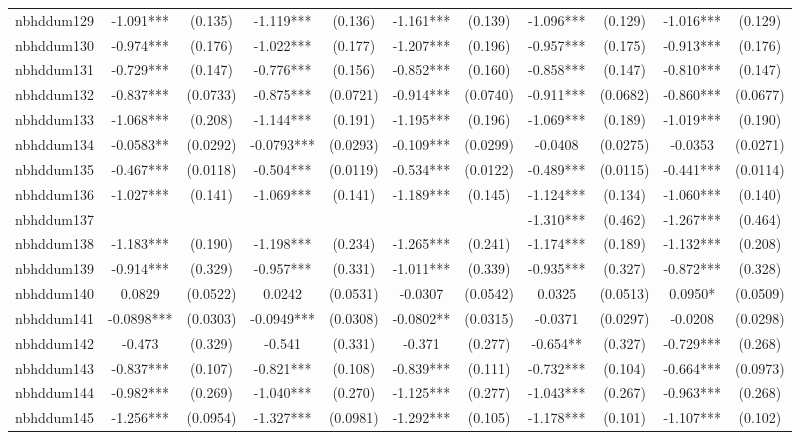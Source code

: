 \documentclass[]{article}
\begin{document}
\begin{tabular}{lcccccccccc}
nbhddum129 & -1.091*** & (0.135) & -1.119*** & (0.136) & -1.161*** & (0.139) & -1.096*** & (0.129) & -1.016*** & (0.129) \\
nbhddum130 & -0.974*** & (0.176) & -1.022*** & (0.177) & -1.207*** & (0.196) & -0.957*** & (0.175) & -0.913*** & (0.176) \\
nbhddum131 & -0.729*** & (0.147) & -0.776*** & (0.156) & -0.852*** & (0.160) & -0.858*** & (0.147) & -0.810*** & (0.147) \\
nbhddum132 & -0.837*** & (0.0733) & -0.875*** & (0.0721) & -0.914*** & (0.0740) & -0.911*** & (0.0682) & -0.860*** & (0.0677) \\
nbhddum133 & -1.068*** & (0.208) & -1.144*** & (0.191) & -1.195*** & (0.196) & -1.069*** & (0.189) & -1.019*** & (0.190) \\
nbhddum134 & -0.0583** & (0.0292) & -0.0793*** & (0.0293) & -0.109*** & (0.0299) & -0.0408 & (0.0275) & -0.0353 & (0.0271) \\
nbhddum135 & -0.467*** & (0.0118) & -0.504*** & (0.0119) & -0.534*** & (0.0122) & -0.489*** & (0.0115) & -0.441*** & (0.0114) \\
nbhddum136 & -1.027*** & (0.141) & -1.069*** & (0.141) & -1.189*** & (0.145) & -1.124*** & (0.134) & -1.060*** & (0.140) \\
nbhddum137 &  &  &  &  &  &  & -1.310*** & (0.462) & -1.267*** & (0.464) \\
nbhddum138 & -1.183*** & (0.190) & -1.198*** & (0.234) & -1.265*** & (0.241) & -1.174*** & (0.189) & -1.132*** & (0.208) \\
nbhddum139 & -0.914*** & (0.329) & -0.957*** & (0.331) & -1.011*** & (0.339) & -0.935*** & (0.327) & -0.872*** & (0.328) \\
nbhddum140 & 0.0829 & (0.0522) & 0.0242 & (0.0531) & -0.0307 & (0.0542) & 0.0325 & (0.0513) & 0.0950* & (0.0509) \\
nbhddum141 & -0.0898*** & (0.0303) & -0.0949*** & (0.0308) & -0.0802** & (0.0315) & -0.0371 & (0.0297) & -0.0208 & (0.0298) \\
nbhddum142 & -0.473 & (0.329) & -0.541 & (0.331) & -0.371 & (0.277) & -0.654** & (0.327) & -0.729*** & (0.268) \\
nbhddum143 & -0.837*** & (0.107) & -0.821*** & (0.108) & -0.839*** & (0.111) & -0.732*** & (0.104) & -0.664*** & (0.0973) \\
nbhddum144 & -0.982*** & (0.269) & -1.040*** & (0.270) & -1.125*** & (0.277) & -1.043*** & (0.267) & -0.963*** & (0.268) \\
nbhddum145 & -1.256*** & (0.0954) & -1.327*** & (0.0981) & -1.292*** & (0.105) & -1.178*** & (0.101) & -1.107*** & (0.102) \\

\end{tabular}
\end{document}
